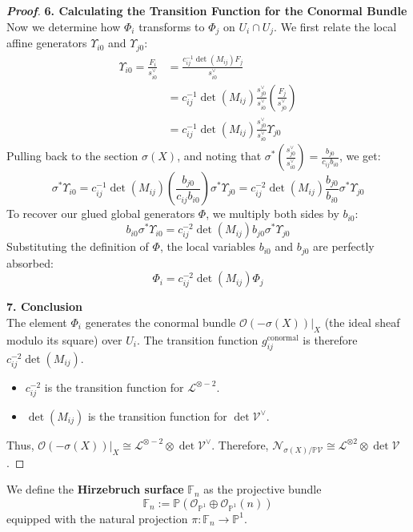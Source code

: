 \begin{proof}[\textbf{Proof}]
\textbf{6. Calculating the Transition Function for the Conormal Bundle} \\
Now we determine how $\Phi_i$ transforms to $\Phi_j$ on $U_i \cap U_j$. We first relate the local affine generators $\Upsilon_{i0}$ and $\Upsilon_{j0}$:
\begin{align*}
\Upsilon_{i0} = \frac{F_i}{s_{i0}^\vee} &= \frac{c_{ij}^{-1} \det(M_{ij}) F_j}{s_{i0}^\vee} \\
&= c_{ij}^{-1} \det(M_{ij}) \frac{s_{j0}^\vee}{s_{i0}^\vee} \left(\frac{F_j}{s_{j0}^\vee}\right) \\
&= c_{ij}^{-1} \det(M_{ij}) \frac{s_{j0}^\vee}{s_{i0}^\vee} \Upsilon_{j0}
\end{align*}
Pulling back to the section $\sigma(X)$, and noting that $\sigma^*\left(\frac{s_{j0}^\vee}{s_{i0}^\vee}\right) = \frac{b_{j0}}{c_{ij} b_{i0}}$, we get:
\[
\sigma^*\Upsilon_{i0} = c_{ij}^{-1} \det(M_{ij}) \left( \frac{b_{j0}}{c_{ij} b_{i0}} \right) \sigma^*\Upsilon_{j0} = c_{ij}^{-2} \det(M_{ij}) \frac{b_{j0}}{b_{i0}} \sigma^*\Upsilon_{j0}
\]
To recover our glued global generators $\Phi$, we multiply both sides by $b_{i0}$:
\[
b_{i0} \sigma^*\Upsilon_{i0} = c_{ij}^{-2} \det(M_{ij}) b_{j0} \sigma^*\Upsilon_{j0}
\]
Substituting the definition of $\Phi$, the local variables $b_{i0}$ and $b_{j0}$ are perfectly absorbed:
\[
\Phi_i = c_{ij}^{-2} \det(M_{ij}) \Phi_j
\]

\textbf{7. Conclusion} \\
The element $\Phi_i$ generates the conormal bundle $\mathcal{O}(-\sigma(X))|_X$ (the ideal sheaf modulo its square) over $U_i$. The transition function $g_{ij}^{\text{conormal}}$ is therefore $c_{ij}^{-2} \det(M_{ij})$. 
\begin{itemize}
    \item $c_{ij}^{-2}$ is the transition function for $\mathcal{L}^{\otimes -2}$.
    \item $\det(M_{ij})$ is the transition function for $\det \mathcal{V}^\vee$.
\end{itemize}
Thus, $\mathcal{O}(-\sigma(X))|_X \cong \mathcal{L}^{\otimes -2} \otimes \det \mathcal{V}^\vee$.
Therefore, $\mathcal{N}_{\sigma(X)/\mathbb{P}\mathcal{V}} \cong \mathcal{L}^{\otimes 2} \otimes \det \mathcal{V}$.
\end{proof}

\begin{definition}
We define the \textbf{Hirzebruch surface} $\mathbb{F}_n$ as the projective bundle 
\[
\mathbb{F}_n := \mathbb{P}(\mathcal{O}_{\mathbb{P}^1} \oplus \mathcal{O}_{\mathbb{P}^1}(n))
\]
equipped with the natural projection $\pi: \mathbb{F}_n \to \mathbb{P}^1$.
\end{definition}


